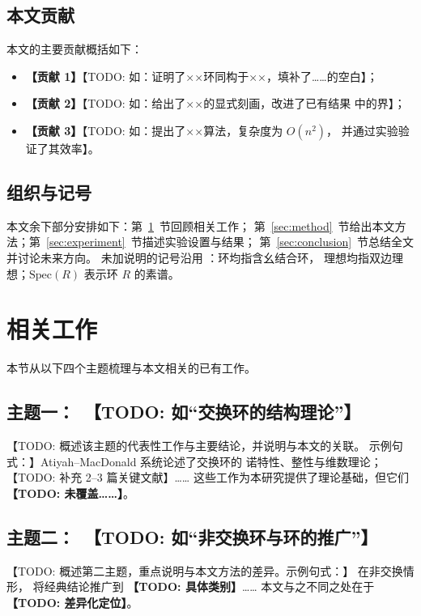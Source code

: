 \documentclass[11pt]{ctexart}
\theoremstyle{plain}
\theoremstyle{definition}
\theoremstyle{remark}
\newcommand{\spec}{\mathrm{Spec}}
\begin{document}
\subsection{本文贡献}
\label{sec:contrib}
本文的主要贡献概括如下：

\begin{itemize}
  \item \textbf{【贡献 1】}【TODO: 如：证明了××环同构于××，填补了……的空白】；
  \item \textbf{【贡献 2】}【TODO: 如：给出了××的显式刻画，改进了已有结果
        \cite{placeholder-ref} 中的界】；
  \item \textbf{【贡献 3】}【TODO: 如：提出了××算法，复杂度为 $O(n^2)$，
        并通过实验验证了其效率】。
\end{itemize}

\subsection{组织与记号}
本文余下部分安排如下：第~\ref{sec:related}~节回顾相关工作；
第~\ref{sec:method}~节给出本文方法；第~\ref{sec:experiment}~节描述实验设置与结果；
第~\ref{sec:conclusion}~节总结全文并讨论未来方向。
未加说明的记号沿用 \cite{placeholder-atiyah}：环均指含幺结合环，
理想均指双边理想；$\spec(R)$ 表示环 $R$ 的素谱。

\section{相关工作}
\label{sec:related}
本节从以下四个主题梳理与本文相关的已有工作。

\subsection{主题一：\ 【TODO: 如“交换环的结构理论”】}
\label{sec:rel1}
【TODO: 概述该主题的代表性工作与主要结论，并说明与本文的关联。
示例句式：】Atiyah--MacDonald \cite{placeholder-atiyah} 系统论述了交换环的
诺特性、整性与维数理论；【TODO: 补充 2--3 篇关键文献】……
这些工作为本研究提供了理论基础，但它们 \textbf{【TODO: 未覆盖……】}。

\subsection{主题二：\ 【TODO: 如“非交换环与环的推广”】}
\label{sec:rel2}
【TODO: 概述第二主题，重点说明与本文方法的差异。示例句式：】
在非交换情形，\cite{placeholder-ref} 将经典结论推广到 \textbf{【TODO: 具体类别】}……
本文与之不同之处在于 \textbf{【TODO: 差异化定位】}。
\end{document}
